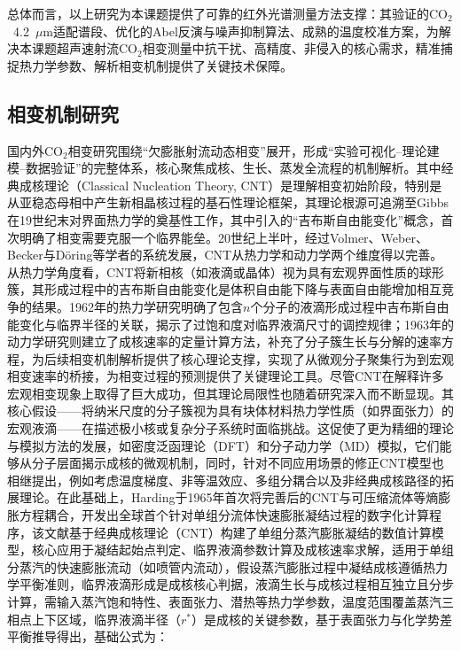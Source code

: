 总体而言，以上研究为本课题提供了可靠的红外光谱测量方法支撑：其验证的CO$_2$~4.2~$\mu$m适配谱段、优化的Abel反演与噪声抑制算法、成熟的温度校准方案，为解决本课题超声速射流CO$_2$相变测量中抗干扰、高精度、非侵入的核心需求，精准捕捉热力学参数、解析相变机制提供了关键技术保障。
\subsection{相变机制研究}
国内外CO$_2$相变研究围绕“欠膨胀射流动态相变”展开，形成“实验可视化--理论建模--数据验证”的完整体系，核心聚焦成核、生长、蒸发全流程的机制解析。其中经典成核理论（Classical Nucleation Theory, CNT）是理解相变初始阶段，特别是从亚稳态母相中产生新相晶核过程的基石性理论框架\supercite{oxtoby1992}，其理论根源可追溯至Gibbs在19世纪末对界面热力学的奠基性工作，其中引入的“吉布斯自由能变化”概念，首次明确了相变需要克服一个临界能垒。20世纪上半叶，经过Volmer、Weber、Becker与Döring等学者的系统发展，CNT从热力学和动力学两个维度得以完善\supercite{becker1935}。从热力学角度看，CNT将新相核（如液滴或晶体）视为具有宏观界面性质的球形簇，其形成过程中的吉布斯自由能变化是体积自由能下降与表面自由能增加相互竞争的结果。1962年的热力学研究明确了包含$n$个分子的液滴形成过程中吉布斯自由能变化与临界半径的关联，揭示了过饱和度对临界液滴尺寸的调控规律\supercite{mcdonald1963}；1963年的动力学研究则建立了成核速率的定量计算方法，补充了分子簇生长与分解的速率方程，为后续相变机制解析提供了核心理论支撑，实现了从微观分子聚集行为到宏观相变速率的桥接，为相变过程的预测提供了关键理论工具。尽管CNT在解释许多宏观相变现象上取得了巨大成功，但其理论局限性也随着研究深入而不断显现\supercite{baek2006study}。其核心假设——将纳米尺度的分子簇视为具有块体材料热力学性质（如界面张力）的宏观液滴——在描述极小核或复杂分子系统时面临挑战。这促使了更为精细的理论与模拟方法的发展，如密度泛函理论（DFT）和分子动力学（MD）模拟，它们能够从分子层面揭示成核的微观机制，同时，针对不同应用场景的修正CNT模型也相继提出，例如考虑温度梯度、非等温效应、多组分耦合以及非经典成核路径的拓展理论\supercite{cnt2006}。在此基础上，Harding于1965年首次将完善后的CNT与可压缩流体等熵膨胀方程耦合\supercite{harding1965}，开发出全球首个针对单组分流体快速膨胀凝结过程的数字化计算程序，该文献基于经典成核理论（CNT）构建了单组分蒸汽膨胀凝结的数值计算模型，核心应用于凝结起始点判定、临界液滴参数计算及成核速率求解，适用于单组分蒸汽的快速膨胀流动（如喷管内流动），假设蒸汽膨胀过程中凝结成核遵循热力学平衡准则，临界液滴形成是成核核心判据，液滴生长与成核过程相互独立且分步计算，需输入蒸汽饱和特性、表面张力、潜热等热力学参数，温度范围覆盖蒸汽三相点上下区域，临界液滴半径（$r^*$）是成核的关键参数，基于表面张力与化学势差平衡推导得出，基础公式为：

